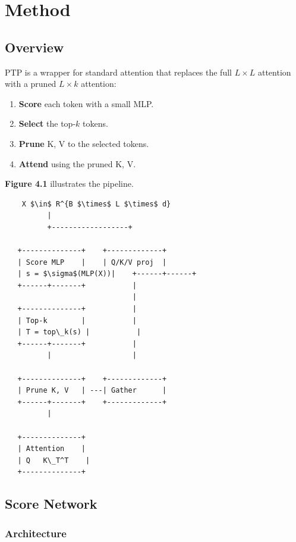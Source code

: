
\section{Method}

\subsection{Overview}

PTP is a wrapper for standard attention that replaces the full $L \times L$ 
attention with a pruned $L \times k$ attention:

\begin{enumerate}
\item \textbf{Score} each token with a small MLP.
\item \textbf{Select} the top-$k$ tokens.
\item \textbf{Prune} K, V to the selected tokens.
\item \textbf{Attend} using the pruned K, V.

\end{enumerate}
\textbf{Figure 4.1} illustrates the pipeline.

\begin{lstlisting}
    X $\in$ R^{B $\times$ L $\times$ d}
          |
          +------------------+
                              
   +--------------+    +-------------+
   | Score MLP    |    | Q/K/V proj  |
   | s = $\sigma$(MLP(X))|    +------+------+
   +------+-------+           |
                              |
   +--------------+           |
   | Top-k        |           |
   | T = top\_k(s) |           |
   +------+-------+           |
          |                   |
                               
   +--------------+    +-------------+
   | Prune K, V   | ---| Gather      |
   +------+-------+    +-------------+
          |
           
   +--------------+
   | Attention    |
   | Q   K\_T^T    |
   +--------------+
\end{lstlisting}

\subsection{Score Network}

\subsubsection{Architecture}

